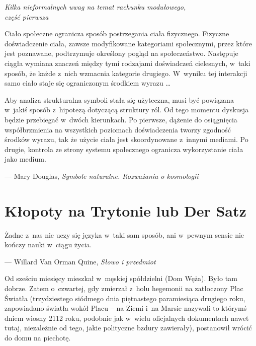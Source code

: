 \documentclass[oneside,polish,11pt,rmheadings]{mwbk}
\begin{document}
\newpage

\tableofcontents

\newpage

\begin{center}
\emph{Kilka nieformalnych uwag na temat rachunku modułowego,\\ część pierwsza }

\end{center}

\bigskip

Ciało społeczne ogranicza sposób postrzegania ciała fizycznego. Fizyczne doświadczenie ciała, zawsze modyfikowane kategoriami społecznymi, przez które jest poznawane, podtrzymuje określony pogląd na społeczeństwo. Następuje ciągła wymiana znaczeń między tymi rodzajami doświadczeń cielesnych, w~taki sposób, że każde z~nich wzmacnia kategorie drugiego. W~wyniku tej interakcji samo ciało staje się ograniczonym środkiem wyrazu \ldots  

Aby analiza strukturalna symboli stała się użyteczna, musi być powiązana w~jakiś sposób z~hipotezą dotyczącą struktury ról. Od tego momentu dyskusja będzie przebiegać w~dwóch kierunkach. Po pierwsze, dążenie do osiągnięcia współbrzmienia na wszystkich poziomach doświadczenia tworzy zgodność środków wyrazu, tak że użycie ciała jest skoordynowane z~innymi mediami. Po drugie, kontrola ze strony systemu społecznego ogranicza wykorzystanie ciała jako medium. 

\medskip

\noindent ---  Mary Douglas, \textit{Symbole naturalne. Rozważania o kosmologii} 
\bigskip

\chapter{Kłopoty na Trytonie lub Der Satz}

\pagestyle{plain}

Żadne z~nas nie uczy się języka w~taki sam sposób, ani w~pewnym sensie nie kończy nauki w~ciągu życia. 

\smallskip
\noindent --- Willard Van Orman Quine, \textit{Słowo i przedmiot} 
\bigskip

Od sześciu miesięcy mieszkał w~męskiej spółdzielni (Dom Węża). Było tam dobrze. Zatem o~czwartej, gdy zmierzał z~holu hegemonii na zatłoczony Plac Światła (trzydziestego siódmego dnia piętnastego paramiesiąca drugiego roku, zapowiadano światła wokół Placu -- na Ziemi i~na Marsie nazywali to którymś dniem wiosny 2112 roku, podobnie jak w~wielu oficjalnych dokumentach nawet tutaj, niezależnie od tego, jakie polityczne bzdury zawierały), postanowił wrócić do domu na piechotę. 
\end{document}
